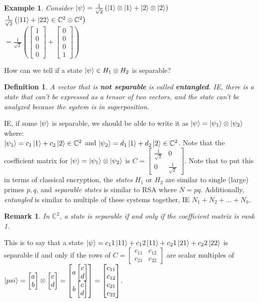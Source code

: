 \documentclass[12pt]{article}
\theoremstyle{plain}
\theoremstyle{nonumberplain}
\theoremstyle{plain}
\newtheorem{definition}[lemma]{Definition}
\newtheorem{example}[lemma]{Example}
\newtheorem{remark}[lemma]{Remark}
\theoremstyle{nonumberplain}
\newcommand\1{{\bf 1}}
\newcommand{\bmat}[1]{\begin{bmatrix*} #1 \end{bmatrix*}} %
\newcommand{\C}{\mathbb{C}} %
\newcommand{\<}{\left\langle}
\renewcommand{\>}{\right\rangle}
\begin{document}
\begin{example}
Consider $\ket{\psi}=\frac{1}{\sqrt{2}}\left(\ket{1}\otimes\ket{1}+\ket{2}\otimes\ket{2}\right)$ \\
$\frac{1}{\sqrt{2}}\left(\ket{11}+\ket{22}\in\C^2\otimes\C^2\right) $ \\
$=\frac{1}{\sqrt{2}}\left(\bmat{1 \\ 0 \\ 0 \\ 0}+\bmat{0 \\ 0 \\ 0 \\ 1}\right) $
\end{example}
How can we tell if a state $\ket{\psi}\in H_1\otimes H_2$ is separable?
\begin{definition}
A vector that is \textbf{not separable} is called \textbf{entangled}. IE, there is a state that can't be expressed as a tensor of two vectors, and the state can't be analyzed because the system is in superposition.
\end{definition}
IE, if some $\ket{\psi}$ is separable, we should be able to write it as $\ket{\psi}=\ket{\psi_1}\otimes\ket{\psi_2}$ where: \\
$\ket{\psi_1}=c_1\ket{1}+c_2\ket{2}\in\C^2$ and
$\ket{\psi_2}=d_1\ket{1}+d_2\ket{2}\in\C^2$. Note that the coefficient matrix for $\ket{\psi}=\ket{\psi_1}\otimes\ket{\psi_2}$ is $C=\bmat{\frac{1}{\sqrt{2}} & 0 \\ 0 & \frac{1}{\sqrt{2}}}$. Note that to put this in terms of classical encryption, the \textit{states} $H_1$ or $H_2$ are similar to single (large) primes $p,q$, and \textit{separable states} is similar to RSA where $N=pq$. Additionally, \textit{entangled} is similar to multiple of these systems together, IE $N_1+N_2+...+N_k$.
\begin{remark}
In $\C^2$, a state is separable if and only if the coefficient matrix is rank 1.
\end{remark}
This is to say that a state $\ket{\psi}=c_11\ket{11}+c_12\ket{11}+c_21\ket{21}+c_22\ket{22}$ is separable if and only if the rows of $C=\bmat{c_{11} & c_{12} \\ c_{21} & c_{22}}$ are scalar multiples of $\ket{psi}=\bmat{a \\ b}\otimes\bmat{c \\ d}=\bmat{a\bmat{c \\ d} \\ b\bmat{c \\ d}}=\bmat{c_{11} \\ c_{12} \\ c_{21} \\ c_{22}}$.
\end{document}
